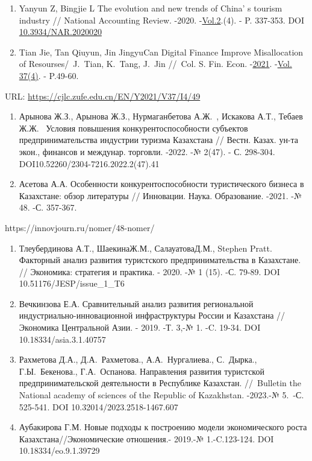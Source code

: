 \begin{enumerate}
\def\labelenumi{\arabic{enumi}.}
\setcounter{enumi}{1}
\item
  Yanyun Z, Bingjie L The evolution and new trends of
  China' s tourism industry // National Accounting
  Review. -2020.
  -\href{https://www.aimspress.com/nar/article/archives}{Vol.2}.(4). -
  P. 337-353. DOI
  \href{https://doi.org/10.3934/NAR.2020020}{10.3934/NAR.2020020}
\item
  Tian Jie, Tan Qiuyun, Jin JingyuCan Digital Finance Improve
  Misallocation of Resourses/~J.~Tian, K.~Tang, J.~Jin //~Col. S. Fin.
  Econ.
  -\href{https://cjlc.zufe.edu.cn/EN/article/showTenYearVolumnDetail.do?nian=2021}{2021}.
  -\href{https://cjlc.zufe.edu.cn/EN/article/showTenYearVolumnDetail.do?nian=2021}{Vol.
  37}\href{file:///C:/Users/admin/Desktop/Вестник\%20КазУТБ/4\%202024/(4)}{(4)}.
  - P.49-60.
\end{enumerate}

URL: \url{https://cjlc.zufe.edu.cn/EN/Y2021/V37/I4/49}

\begin{enumerate}
\def\labelenumi{\arabic{enumi}.}
\setcounter{enumi}{3}
\item
  Арынова Ж.З., Арынова Ж.З., Нурмаганбетова А.Ж.~, Искакова А.Т.,
  Тебаев Ж.Ж.~ Условия повышения конкурентоспособности субъектов
  предпринимательства индустрии туризма Казахстана // Вестн. Казах.
  ун-та экон., финансов и междунар. торговли. -2022. -№ 2(47). - С.
  298-304. DOI10.52260/2304-7216.2022.2(47).41
\item
  Асетова А.А. Особенности конкурентоспособности туристического бизнеса
  в Казахстане: обзор литературы // Инновации. Наука. Образование.
  -2021. -№ 48. -С. 357-367.
\end{enumerate}

https://innovjourn.ru/nomer/48-nomer/

\begin{enumerate}
\def\labelenumi{\arabic{enumi}.}
\setcounter{enumi}{5}
\item
  Тлеубердинова А.Т., ШаекинаЖ.М., СалауатоваД.М., Stephen Pratt.
  Факторный анализ развития туристского предпринимательства в
  Казахстане. // Экономика: стратегия и практика. - 2020. -№ 1 (15). -С.
  79-89. DOI 10.51176/JESP/issue\_1\_T6
\item
  Вечкинзова Е.А. Сравнительный анализ развития региональной
  индустриально-инновационной инфраструктуры России и Казахстана //
  Экономика Центральной Азии. - 2019. -Т. 3,-№ 1. -C. 19-34. DOI
  10.18334/asia.3.1.40757
\item
  Рахметова Д.А., Д.А.~Рахметова., А.А.~Нургалиева., С.~Дырка.,
  Г.Ы.~Бекенова., Г.А.~Оспанова. Направления развития туристской
  предпринимательской деятельности в Республике Казахстан. //~Bulletin
  the National academy of sciences of the Republic of Kazakhstan.
  -2023.-№ 5.~-С. 525-541. DOI 10.32014/2023.2518-1467.607
\item
  Аубакирова Г.М. Новые подходы к построению модели экономического роста
  Казахстана//Экономические отношения.- 2019.-№ 1.-C.123-124. DOI
  10.18334/eo.9.1.39729
\end{enumerate}

